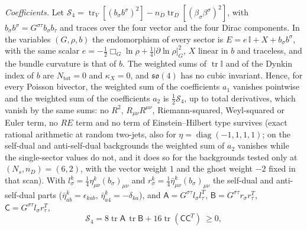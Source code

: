 \emph{Coefficients.} Let \(\mathcal S_4=\operatorname{tr}_V[(b_\sigma b^\sigma)^2]-n_D\operatorname{tr}_D[(\beta_\sigma\beta^\sigma)^2]\), with \(b_\sigma b^\sigma=G^{\sigma\tau}b_\sigma b_\tau\) and traces over the four vector and the four Dirac components. In the variables \((G,\rho,b)\) the endomorphism of every sector is \(E=e\,\mathbb I+X+b_\sigma b^\sigma\), with the same scalar \(e=-\tfrac12\Box_G\ln\rho+\tfrac14|\partial\ln\rho|^2_G\), \(X\) linear in \(b\) and traceless, and the bundle curvature is that of \(b\). The weighted sums of \(\operatorname{tr}\mathbb I\) and of the Dynkin index of \(b\) are \(N_{\mathrm{tot}}=0\) and \(\kappa_X=0\), and \(\mathfrak{so}(4)\) has no cubic invariant. Hence, for every Poisson bivector, the weighted sum of the coefficients \(a_1\) vanishes pointwise and the weighted sum of the coefficients \(a_2\) is \(\tfrac12\mathcal S_4\), up to total derivatives, which vanish by the same sums: no \(R^2\), \(R_{\mu\nu}R^{\mu\nu}\), Riemann-squared, Weyl-squared or Euler term, no \(RE\) term and no term of Einstein--Hilbert type survives (exact rational arithmetic at random two-jets, also for \(\eta=\operatorname{diag}(-1,1,1,1)\); on the self-dual and anti-self-dual backgrounds the weighted sum of \(a_2\) vanishes while the single-sector values do not, and it does so for the backgrounds tested only at \((N_s,n_D)=(6,2)\), with the vector weight \(1\) and the ghost weight \(-2\) fixed in that scan). With \(l^k_\sigma=\tfrac14\eta^k_{\mu\nu}(b_\sigma)_{\mu\nu}\) and \(r^k_\sigma=\tfrac14\bar\eta^k_{\mu\nu}(b_\sigma)_{\mu\nu}\) the self-dual and anti-self-dual parts (\(\bar\eta^k_{ab}=\epsilon_{kab}\), \(\bar\eta^k_{a4}=-\delta_{ka}\)), and \(\mathsf A=G^{\sigma\tau}l_\sigma l_\tau^T\), \(\mathsf B=G^{\sigma\tau}r_\sigma r_\tau^T\), \(\mathsf C=G^{\sigma\tau}l_\sigma r_\tau^T\),
\[
  \mathcal S_4=8\operatorname{tr}\mathsf A\,\operatorname{tr}\mathsf B+16\operatorname{tr}(\mathsf C\mathsf C^T)\ \ge0,
\]
